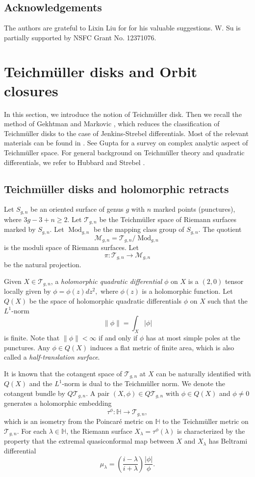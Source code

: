 \documentclass[11pt]{amsart}
\theoremstyle{plain}
\newcommand{\Tei}{\mathcal{T}}
\newcommand{\HP}{\mathbb{H}}
\newcommand{\Mod}{\operatorname{Mod}}
\begin{document}
\subsection*{Acknowledgements} The authors are grateful to Lixin Liu for for his valuable suggestions. W. Su is partially
 supported by NSFC Grant No. 12371076.

\section{Teichm\"{u}ller disks and Orbit closures}

In this section, we introduce the notion of Teichm\"uller disk.
Then we recall the method of  Gekhtman and Markovic \cite{GM2020},
which reduces the classification of Teichm\"uller disks  to the case of Jenkins-Strebel differentials. 
Most of the  relevant materials can be found in \cite{GM2020}. 
See Gupta \cite{Gupta2020} for a survey on complex analytic aspect of Teichm\"uller space. 
For general background on Teichm\"uller theory and quadratic differentials, we refer to 
Hubbard \cite{Hubbard} and Strebel \cite{Strebel}.

\subsection{Teichm\"{u}ller disks and holomorphic retracts}
Let $S_{g,n}$ be an oriented surface of genus $g$
with $n$ marked points (punctures), where $3g-3+n\geq 2$. Let $\Tei_{g,n}$ be the Teichm\"{u}ller space of Riemann surfaces marked by $S_{g,n}$.
Let $\Mod_{g,n}$ be the mapping class group of $S_{g,n}$. The quotient $$\mathcal{M}_{g,n}=\Tei_{g,n}/\Mod_{g,n}$$ is the moduli space of Riemann surfaces. Let
 $$\pi:\Tei_{g,n}\rightarrow \mathcal{M}_{g,n}$$ be the natural projection.

Given $X\in \Tei_{g,n}$, a \emph{holomorphic quadratic differential} $\phi$ on $X$ is a $(2,0)$ tensor
locally given by 
$\phi=\phi(z) dz^2,$
where $\phi(z)$ is a holomorphic function. 
Let $Q(X)$ be the space of holomorphic quadratic differentials $\phi$ on $X$ such that the $L^1$-norm
$$\|\phi\| = \int_X |\phi|$$
is finite. Note that $\|\phi\|<\infty$ 
 if and only if $\phi$ has at most simple poles at the punctures. 
Any $\phi\in Q(X)$ 
induces a flat metric of finite area, which is also called a \emph{half-translation surface}. 

It is known that the  cotangent space of $\Tei_{g,n}$ at $X$
can be naturally identified with $Q(X)$ and the $L^1$-norm is dual to the Teichm\"uller norm. 
We denote the cotangent bundle by $Q\Tei_{g,n}$. 
A pair $(X,\phi)\in Q\Tei_{g,n}$ with $\phi\in Q(X)$ and $\phi\neq 0$ generates a holomorphic embedding
$$\tau^\phi: \HP \rightarrow \Tei_{g,n},$$ 
which is an isometry from the Poincar\'e metric on $\HP$
to the Teichm\"uller metric on $\Tei_{g,n}$. For each $\lambda\in \mathbb{H}$, 
the Riemann surface $X_\lambda= \tau^\phi(\lambda)$ is characterized by the property that the extremal quasiconformal map between $X$ and $X_\lambda$ has Beltrami differential 
$$\mu_\lambda = \left( \frac{i-\lambda}{i+\lambda}  \right) \frac{|\phi|}{\phi}.$$
\end{document}

